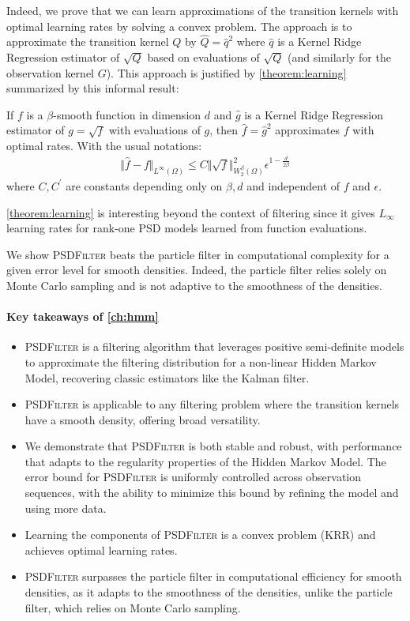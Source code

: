Indeed, we prove that we can learn approximations of the transition kernels with optimal learning rates by solving a convex problem. The approach is to approximate the transition kernel $Q$ by $\hat Q = \hat q^2$ where $\hat q$ is a Kernel Ridge Regression estimator of $\sqrt{Q}$ based on evaluations of $\sqrt{Q}$ (and similarly for the observation kernel $G$). This approach is justified by \cref{theorem:learning} summarized by this informal result:
\begin{mdframed}
\begin{informaltheorem}
If $f$ is a $\beta$-smooth function in dimension $d$ and $\hat g$ is a Kernel Ridge Regression estimator of $g = \sqrt{f}$ with evaluations of $g$, then $\hat f = \hat g^2$ approximates $f$ with optimal rates. With the usual notations:
\begin{align}
    \Vert \hat f - f \Vert_{L^\infty(\Omega)}\leq C \Vert \sqrt{f}\Vert_{W^\beta_2(\Omega)}^2\epsilon^{1-\frac{d}{2\beta}}
\end{align}
where $C, C^\prime$ are constants depending only on $\beta, d$ and independent of $f$ and $\epsilon$.
\end{informaltheorem}
\end{mdframed}
\noindent \cref{theorem:learning} is interesting beyond the context of filtering since it gives $L_\infty$ learning rates for rank-one PSD models learned from function evaluations.

We show \textsc{PSDFilter} beats the particle filter in computational complexity for a given error level for smooth densities. Indeed, the particle filter relies solely on Monte Carlo sampling and is not adaptive to the smoothness of the densities.
\paragraph{Key takeaways of \cref{ch:hmm}}
\begin{itemize}
    \item \textsc{PSDFilter} is a filtering algorithm that leverages positive semi-definite models to approximate the filtering distribution for a non-linear Hidden Markov Model, recovering classic estimators like the Kalman filter.
    \item \textsc{PSDFilter} is applicable to any filtering problem where the transition kernels have a smooth density, offering broad versatility.
    \item We demonstrate that \textsc{PSDFilter} is both stable and robust, with performance that adapts to the regularity properties of the Hidden Markov Model. The error bound for \textsc{PSDFilter} is uniformly controlled across observation sequences, with the ability to minimize this bound by refining the model and using more data.
    \item Learning the components of \textsc{PSDFilter} is a convex problem (KRR) and achieves optimal learning rates.
    \item \textsc{PSDFilter} surpasses the particle filter in computational efficiency for smooth densities, as it adapts to the smoothness of the densities, unlike the particle filter, which relies on Monte Carlo sampling.
\end{itemize}
